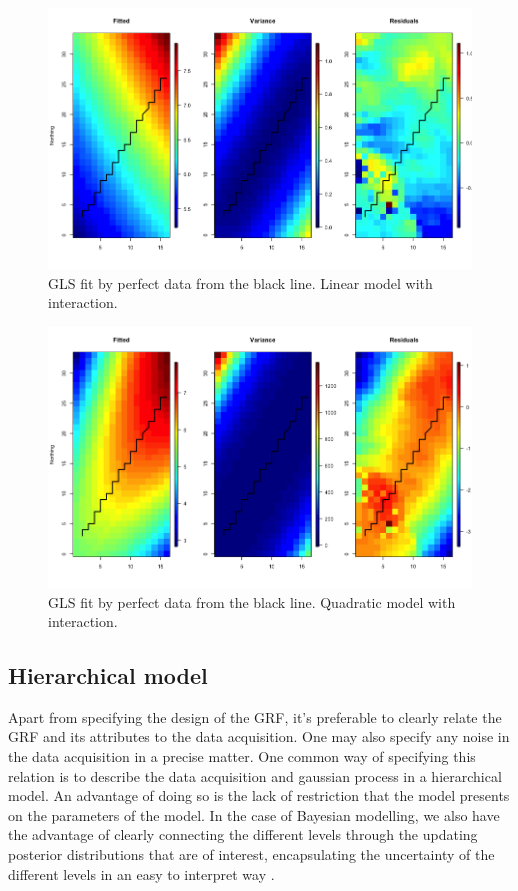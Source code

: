\begin{figure}[p]
     \centering
     \includegraphics[width=1\linewidth]{figurer/gls_simple.png}
     \caption{GLS fit by perfect data from the black line. Linear model with interaction.}
      \label{fig:gls_simple}
\end{figure}
\begin{figure}[p]
     \centering
     \includegraphics[width=1\linewidth]{figurer/gls_quadratic.png}
	 \caption{GLS fit by perfect data from the black line. Quadratic model with interaction.} 
	 \label{fig:gls_quadratic}
\end{figure}

\subsection{Hierarchical model} \label{model:hm}
Apart from specifying the design of the GRF, it's preferable to clearly relate the GRF and its attributes to the data acquisition. One may also specify any noise in the data acquisition in a precise matter. One common way of specifying this relation is to describe the data acquisition and gaussian process in a hierarchical model. An advantage of doing so is the lack of restriction that the model presents on the parameters of the model. In the case of Bayesian modelling, we also have the advantage of clearly connecting the different levels through the updating posterior distributions that are of interest, encapsulating the uncertainty of the different levels in an easy to interpret way \cite{LeEtAl}.  

